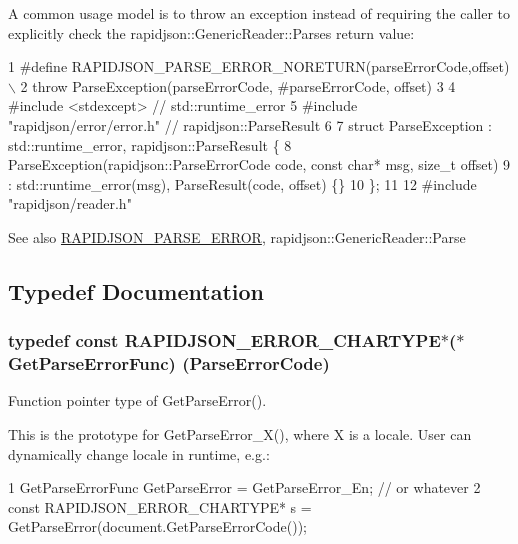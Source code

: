 A common usage model is to throw an exception instead of requiring the caller to explicitly check the rapidjson\+::\+Generic\+Reader\+::\+Parse\textquotesingle{}s return value\+:


\begin{DoxyCode}
1 #define RAPIDJSON\_PARSE\_ERROR\_NORETURN(parseErrorCode,offset) \(\backslash\)
2    throw ParseException(parseErrorCode, #parseErrorCode, offset)
3 
4 #include <stdexcept>               // std::runtime\_error
5 #include "rapidjson/error/error.h" // rapidjson::ParseResult
6 
7 struct ParseException : std::runtime\_error, rapidjson::ParseResult \{
8   ParseException(rapidjson::ParseErrorCode code, const char* msg, size\_t offset)
9     : std::runtime\_error(msg), ParseResult(code, offset) \{\}
10 \};
11 
12 #include "rapidjson/reader.h"
\end{DoxyCode}


\begin{DoxySeeAlso}{See also}
\hyperlink{group___r_a_p_i_d_j_s_o_n___e_r_r_o_r_s_gae3689840fa6e89a241313f33b602f865}{R\+A\+P\+I\+D\+J\+S\+O\+N\+\_\+\+P\+A\+R\+S\+E\+\_\+\+E\+R\+R\+OR}, rapidjson\+::\+Generic\+Reader\+::\+Parse 
\end{DoxySeeAlso}


\subsection{Typedef Documentation}
\subsubsection[{\texorpdfstring{Get\+Parse\+Error\+Func}{GetParseErrorFunc}}]{\setlength{\rightskip}{0pt plus 5cm}typedef const {\bf R\+A\+P\+I\+D\+J\+S\+O\+N\+\_\+\+E\+R\+R\+O\+R\+\_\+\+C\+H\+A\+R\+T\+Y\+PE}$\ast$($\ast$ Get\+Parse\+Error\+Func) ({\bf Parse\+Error\+Code})}\hypertarget{group___r_a_p_i_d_j_s_o_n___e_r_r_o_r_s_ga586548166441ab3ce30219cb35be2e04}{}\label{group___r_a_p_i_d_j_s_o_n___e_r_r_o_r_s_ga586548166441ab3ce30219cb35be2e04}


Function pointer type of Get\+Parse\+Error(). 

This is the prototype for {\ttfamily Get\+Parse\+Error\+\_\+\+X()}, where {\ttfamily X} is a locale. User can dynamically change locale in runtime, e.\+g.\+: 
\begin{DoxyCode}
1 GetParseErrorFunc GetParseError = GetParseError\_En; // or whatever
2 const RAPIDJSON\_ERROR\_CHARTYPE* s = GetParseError(document.GetParseErrorCode());
\end{DoxyCode}
